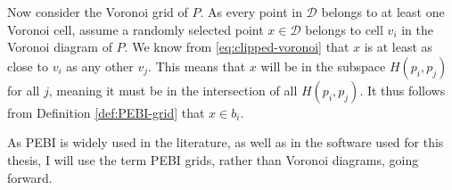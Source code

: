 Now consider the Voronoi grid of $P$. As every point in $\mathcal{D}$ belongs to at least one Voronoi cell, assume a randomly selected point $x \in \mathcal{D}$ belongs to cell $v_i$ in the Voronoi diagram of $P$. We know from  \autoref{eq:clipped-voronoi} that $x$ is at least as close to $v_i$ as any other $v_j$. This means that $x$ will be in the subspace $H(p_i, p_j)$ for all $j$, meaning it must be in the intersection of all $H(p_i, p_j)$. It thus follows from Definition \ref{def:PEBI-grid} that $x \in b_i$.

As PEBI is widely used in the literature, as well as in the software used for this thesis, I will use the term PEBI grids, rather than Voronoi diagrams, going forward.

